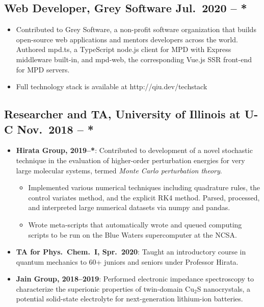 \documentclass{article}
\begin{document}
\subsection{Web Developer, Grey Software \hfill Jul.\ 2020 -- *}
\begin{itemize}[noitemsep, nolistsep]
	\item Contributed to Grey Software, a non-profit software organization that
		builds open-source web applications and mentors developers across the
		world. Authored mpd.ts, a TypeScript node.js client for MPD with Express
		middleware built-in, and mpd-web, the corresponding Vue.js SSR front-end
		for MPD servers.

	\item Full technology stack is available at http://qiu.dev/techstack
\end{itemize}

\subsection{Researcher and TA, University of Illinois at U-C
            \hfill Nov.\ 2018 -- *}
\begin{itemize}[noitemsep,nolistsep]
	\item \textbf{Hirata Group, 2019--*}: Contributed to development of a novel
		stochastic technique in the evaluation of higher-order
		perturbation energies for very large molecular systems, termed
		\emph{Monte Carlo perturbation theory}.

		\begin{itemize}
			\item Implemented various numerical techniques including quadrature
				rules, the control variates method, and the explicit RK4 method.
				Parsed, processed, and interpreted large numerical
				datasets via numpy and pandas.

			\item Wrote meta-scripts that automatically wrote and queued
				computing scripts to be run on the Blue Waters supercomputer at
				the NCSA.
		\end{itemize}

	\item \textbf{TA for Phys.\ Chem.\ I, Spr.\ 2020}: Taught an
		introductory course in quantum mechanics to 60+
		juniors and seniors under Professor Hirata.

	\item \textbf{Jain Group, 2018--2019}: Performed electronic impedance
		spectroscopy to characterize the superionic properties of twin-domain
		Cu$_2$S nanocrystals, a potential solid-state electrolyte for
		next-generation lithium-ion batteries.
\end{itemize}
\end{document}

